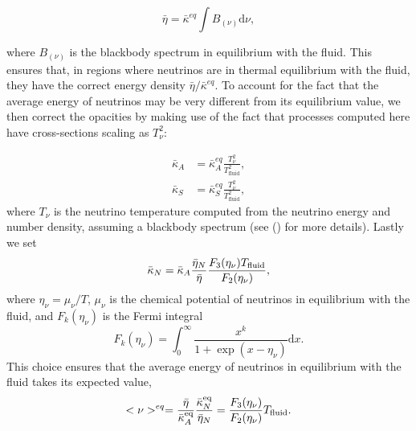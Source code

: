 \begin{equation}
\bar \eta = \bar\kappa^{eq}\int B_{(\nu)}\mathrm{d}\nu,
\end{equation}

where $B_{(\nu)}$ is the blackbody spectrum in equilibrium with the fluid. This ensures that, in regions where neutrinos are in thermal equilibrium with the fluid, they have the correct energy density $\bar \eta/\bar\kappa^{eq}$. To account for the fact that the average energy of neutrinos may be very different from its equilibrium value, we then correct the opacities by making use of the fact that processes computed here have cross-sections scaling as $T_\nu^2$:

%
\begin{align}
   \bar \kappa_A &= \bar \kappa^{eq}_A\frac{T_\nu^2}{T_{\text{fluid}}^2}, \\
  \bar \kappa_S &= \bar \kappa^{eq}_S\frac{T_\nu^2}{T_{\text{fluid}}^2},
\end{align}
%
where $T_\nu$ is the neutrino temperature computed from the neutrino energy and number density, assuming a blackbody spectrum (see (\citet*{foucart2016impact}) for more details). Lastly we set
%
\begin{equation}
\bar \kappa_N = \bar \kappa_A \frac{\bar\eta_N}{\bar\eta}\frac{F_3(\eta_\nu)T_{\rm fluid}}{F_2(\eta_\nu)},
\end{equation}
%
where $\eta_\nu = \mu_\nu/T$, $\mu_\nu$ is the chemical potential of neutrinos in equilibrium with the fluid, and $F_k(\eta_\nu)$ is the Fermi integral
%
\begin{equation}
F_k(\eta_\nu) = \int^\infty_0\frac{x^k}{1 + \exp(x - \eta_\nu)}\mathrm{d}x.
\end{equation}
This choice ensures that the average energy of neutrinos in equilibrium with the fluid takes its expected value,
\begin{equation}
<\nu>^{eq} = \frac{\bar \eta}{\bar \kappa_A^{\rm eq}} \frac{\bar \kappa_N^{\rm eq}}{\bar \eta_N} = \frac{F_3(\eta_\nu)}{F_2(\eta_\nu)} T_{\rm fluid}.
\end{equation}

%



